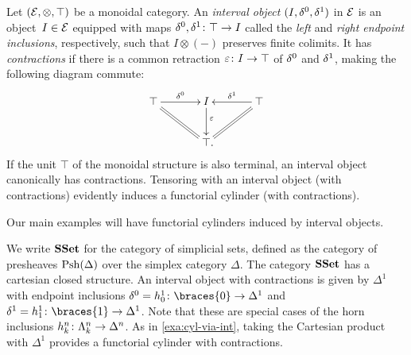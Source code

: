 \documentclass[reqno,10pt,a4paper,oneside,draft]{amsart}
\begin{document}
\begin{example} \label{exa:cyl-via-int}
Let $(\mathcal{E}, \otimes, \top)$ be a monoidal category.
An \emph{interval object} $(I, \delta^0, \delta^1)$ in $\mathcal{E}$ is an object~$I \in \mathcal{E}$ equipped with maps $\delta^0, \delta^1 \colon \top \to I$ called the \emph{left} and \emph{right endpoint inclusions}, respectively, such that $I \otimes (-)$ preserves finite colimits.
It has \emph{contractions} if there is a common retraction $\varepsilon \colon I \to \top$ of $\delta^0$ and $\delta^1$, making the following diagram commute:
\[
\xymatrix@C+1em{
  \top
  \ar[r]^-{\lcyl}
  \ar@{=}[dr]
&
  \interval
  \ar[d]^(0.4){\ccyl}
&
  \top
  \ar[l]_-{\rcyl}
  \ar@{=}[dl]
\\&
  \top
\rlap{.}}
\]
If the unit $\top$ of the monoidal structure is also terminal, an interval object canonically has contractions.
Tensoring with an interval object (with contractions) evidently induces a functorial cylinder (with contractions).
\end{example}

Our main examples will have functorial cylinders induced by interval objects.







\begin{example} \label{exa:cyl-in-sset}
We write $\mathbf{SSet}$ for the category of simplicial sets, defined as the category of presheaves $\mathrm{Psh}(\Delta)$ over the simplex category $\Delta$.
The category $\mathbf{SSet}$ has a cartesian closed structure. An interval object with contractions is given by $\Delta^1$ with endpoint inclusions $\lcyl = h_0^1 \co \braces{0} \to \Delta^1$ and $\rcyl = h_1^1 \co \braces{1} \to \Delta^1$.
Note that these are special cases of the horn inclusions $h_k^n \colon \Lambda_k^n \to \Delta^n$.
As in \cref{exa:cyl-via-int}, taking the Cartesian product with $\Delta^1$ provides a functorial cylinder with contractions.
\end{example}
\end{document}
